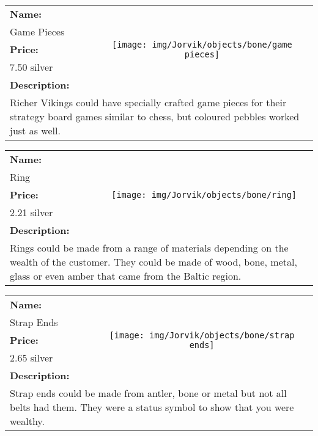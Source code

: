 \begin{table}[ht!]
	\centering
	\begin{tabular}{ p{3cm} c }\toprule
		\textbf{Name:} & \multirow{5}{*}{\texttt{[image: img/Jorvik/objects/bone/game pieces]}}\\
		Game Pieces & \\ 
		\textbf{Price:} & \\
		7.50 silver & \\ 
		\textbf{Description:} & \\
		\multicolumn{2}{p{12cm}}{Richer Vikings could have specially crafted game pieces for their strategy board games similar to chess, but coloured pebbles worked just as well.}\\
		\bottomrule
	\end{tabular}
\end{table}

\begin{table}[ht!]
	\centering
	\begin{tabular}{ p{3cm} c }\toprule
		\textbf{Name:} & \multirow{5}{*}{\texttt{[image: img/Jorvik/objects/bone/ring]}}\\
		Ring & \\ 
		\textbf{Price:} & \\
		2.21 silver & \\ 
		\textbf{Description:} & \\
		\multicolumn{2}{p{12cm}}{Rings could be made from a range of materials depending on the wealth of the customer. They could be made of wood, bone, metal, glass or even amber that came from the Baltic region.}\\
		\bottomrule
	\end{tabular}
\end{table}

\begin{table}[ht!]
	\centering
	\begin{tabular}{ p{3cm} c }\toprule
		\textbf{Name:} & \multirow{5}{*}{\texttt{[image: img/Jorvik/objects/bone/strap ends]}}\\
		Strap Ends & \\ 
		\textbf{Price:} & \\
		2.65 silver & \\ 
		\textbf{Description:} & \\
		\multicolumn{2}{p{12cm}}{Strap ends could be made from antler, bone or metal but not all belts had them. They were a status symbol to show that you were wealthy.}\\
		\bottomrule
	\end{tabular}
\end{table}

